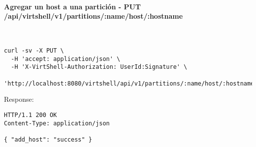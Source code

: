 \paragraph{Agregar un host a una partición - PUT /api/virtshell/v1/partitions/:name/host/:hostname} ~\\

\begin{lstlisting}[style=json]
curl -sv -X PUT \
  -H 'accept: application/json' \
  -H 'X-VirtShell-Authorization: UserId:Signature' \
  'http://localhost:8080/virtshell/api/v1/partitions/:name/host/:hostname'
\end{lstlisting}

Response:

\begin{lstlisting}[style=json]
HTTP/1.1 200 OK
Content-Type: application/json

{ "add_host": "success" }
\end{lstlisting}